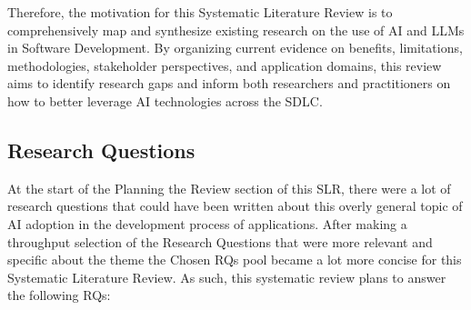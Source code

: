 Therefore, the motivation for this Systematic Literature Review is to comprehensively map and synthesize existing research on the use of AI and LLMs in Software Development. By organizing current evidence on benefits, limitations, methodologies, stakeholder perspectives, and application domains, this review aims to identify research gaps and inform both researchers and practitioners on how to better leverage AI technologies across the SDLC.

\subsection{Research Questions}
At the start of the Planning the Review section of this SLR, there were a lot of research questions that could have been written about this overly general topic of AI adoption in the development process of applications. After making a throughput selection of the Research Questions that were more relevant and specific about the theme the Chosen RQs pool became a lot more concise for this Systematic Literature Review. As such, this systematic review plans to answer the following RQs:

